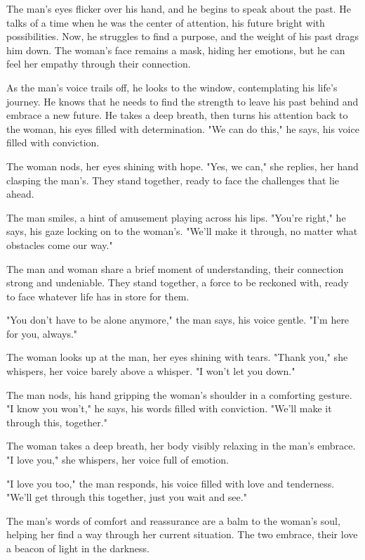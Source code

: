 \documentclass[smalldemyvopaper,11pt,twoside,onecolumn,openright,extrafontsizes]{memoir}
\begin{document}
The man's eyes flicker over his hand, and he begins to speak about the past. He talks of a time when he was the center of attention, his future bright with possibilities. Now, he struggles to find a purpose, and the weight of his past drags him down. The woman's face remains a mask, hiding her emotions, but he can feel her empathy through their connection.\par
As the man's voice trails off, he looks to the window, contemplating his life's journey. He knows that he needs to find the strength to leave his past behind and embrace a new future. He takes a deep breath, then turns his attention back to the woman, his eyes filled with determination. "We can do this," he says, his voice filled with conviction.\par
The woman nods, her eyes shining with hope. "Yes, we can," she replies, her hand clasping the man's. They stand together, ready to face the challenges that lie ahead.\par
The man smiles, a hint of amusement playing across his lips. "You're right," he says, his gaze locking on to the woman's. "We'll make it through, no matter what obstacles come our way."\par
The man and woman share a brief moment of understanding, their connection strong and undeniable. They stand together, a force to be reckoned with, ready to face whatever life has in store for them.\par
"You don't have to be alone anymore," the man says, his voice gentle. "I'm here for you, always."\par
The woman looks up at the man, her eyes shining with tears. "Thank you," she whispers, her voice barely above a whisper. "I won't let you down."\par
The man nods, his hand gripping the woman's shoulder in a comforting gesture. "I know you won't," he says, his words filled with conviction. "We'll make it through this, together."\par
The woman takes a deep breath, her body visibly relaxing in the man's embrace. "I love you," she whispers, her voice full of emotion.\par
"I love you too," the man responds, his voice filled with love and tenderness. "We'll get through this together, just you wait and see."\par
The man's words of comfort and reassurance are a balm to the woman's soul, helping her find a way through her current situation. The two embrace, their love a beacon of light in the darkness.\par
\end{document}
